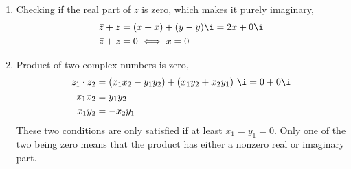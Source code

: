 \begin{enumerate}
    \item Checking if the real part of $ z $ is zero, which makes it purely imaginary,
          \begin{align}
              \bar{z} + z & = (x + x) + (y - y)\i = 2x + 0\i \\
              \bar{z} + z & = 0 \iff x = 0
          \end{align}

    \item Product of two complex numbers is zero,
          \begin{align}
              z_1 \cdot z_2 & = (x_1x_2 - y_1y_2) + (x_1y_2 + x_2 y_1)\ \i = 0 + 0\i \\
              x_1x_2        & = y_1y_2                                               \\
              x_1y_2        & = -x_2y_1
          \end{align}
          These two conditions are only satisfied if at least $ x_1 = y_1 = 0 $. Only one
          of the two being zero means that the product has either a nonzero real or
          imaginary part.


\end{enumerate}
